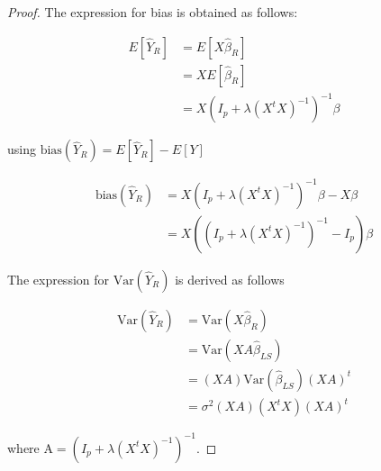 \documentclass[paper=a4, fontsize=11pt]{scrartcl} %
\numberwithin{equation}{section} %
\begin{document}
\begin{proof}

The expression for bias is obtained as follows:

\begin{align}
E[\hat{Y}_R] &= E[X \hat{\beta}_R] \\
&= X E[\hat{\beta}_R] \\
&= X (I_p + \lambda (X^t X)^{-1})^{-1} \beta
\end{align}

using $\text{bias}(\hat{Y}_R) = E[\hat{Y}_R] - E[Y]$

\begin{align}
\textrm{bias}(\hat{Y}_R) &= X (I_p + \lambda (X^t X)^{-1})^{-1} \beta - X \beta \\
&= X ((I_p + \lambda (X^t X)^{-1})^{-1} - I_p) \beta
\end{align}

The expression for $\textrm{Var}(\hat{Y}_R)$ is derived as follows

\begin{align}
\textrm{Var}(\hat{Y}_R) &= \text{Var}(X \hat{\beta}_R) \\
&= \text{Var}(X A \hat{\beta}_{LS}) \\
&= (XA) \text{Var}(\hat{\beta}_{LS})(XA)^t \\
&= \sigma^2(XA)(X^t X)(XA)^t
\end{align}

where $\textrm{A} = (I_p + \lambda (X^t X)^{-1})^{-1}$.

\end{proof}
\end{document}
